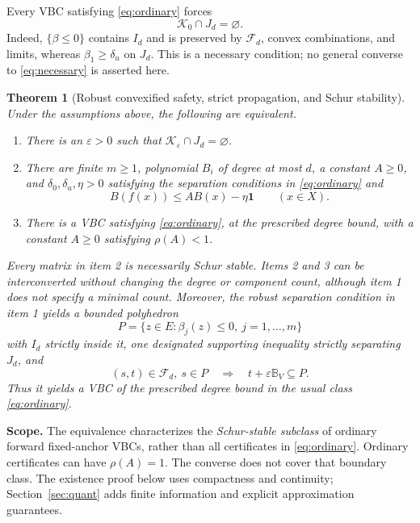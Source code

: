 \documentclass[journal,10pt]{IEEEtran}
\newtheorem{theorem}{Theorem}
\theoremstyle{definition}\newtheorem{definition}{Definition}
\theoremstyle{remark}
\newcommand{\one}{\mathbf 1}
\newcommand{\ball}{\mathbb B_V}
\newcommand{\F}{\mathcal F_d}
\begin{document}
Every VBC satisfying \eqref{eq:ordinary} forces
\begin{equation}\label{eq:necessary}
 \mathcal K_0\cap J_d=\varnothing.
\end{equation}
Indeed, $\{\beta\leq0\}$ contains $I_d$ and is preserved by $\F$, convex combinations, and limits, whereas $\beta_1\geq\delta_u$ on $J_d$. This is a necessary condition; no general converse to \eqref{eq:necessary} is asserted here.

\begin{theorem}[Robust convexified safety, strict propagation, and Schur stability]\label{th:main}
Under the assumptions above, the following are equivalent.
\begin{enumerate}
\item There is an $\varepsilon>0$ such that $\mathcal K_\varepsilon\cap J_d=\varnothing$.
\item There are finite $m\geq1$, polynomial $B_i$ of degree at most $d$, a constant $A\geq0$, and $\delta_0,\delta_u,\eta>0$ satisfying the separation conditions in \eqref{eq:ordinary} and
\begin{equation}\label{eq:strict}
 B(f(x))\leq AB(x)-\eta\one\qquad(x\in X).
\end{equation}
\item There is a VBC satisfying \eqref{eq:ordinary}, at the prescribed degree bound, with a constant $A\geq0$ satisfying $\rho(A)<1$.
\end{enumerate}
Every matrix in item 2 is necessarily Schur stable. Items 2 and 3 can be interconverted without changing the degree or component count, although item 1 does not specify a minimal count.
Moreover, the robust separation condition in item 1 yields a bounded polyhedron
\[
 P=\{z\in E:\beta_j(z)\leq0,\ j=1,\ldots,m\}
\]
with $I_d$ strictly inside it, one designated supporting inequality strictly separating $J_d$, and
\[
 (s,t)\in\F,\ s\in P\quad\Longrightarrow\quad t+\varepsilon\ball\subseteq P.
\]
Thus it yields a VBC of the prescribed degree bound in the usual class \eqref{eq:ordinary}.
\end{theorem}

\textbf{Scope.} The equivalence characterizes the \emph{Schur-stable subclass} of ordinary forward fixed-anchor VBCs, rather than all certificates in \eqref{eq:ordinary}. Ordinary certificates can have $\rho(A)=1$. The converse does not cover that boundary class. The existence proof below uses compactness and continuity; Section~\ref{sec:quant} adds finite information and explicit approximation guarantees.
\end{document}
